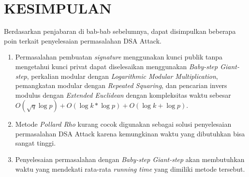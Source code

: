 \chapter{KESIMPULAN}

Berdasarkan penjabaran di bab-bab sebelumnya, dapat disimpulkan beberapa poin terkait penyelesaian permasalahan DSA Attack.
\begin{enumerate}
\item Permasalahan pembuatan \textit{signature} menggunakan kunci publik tanpa mengetahui kunci privat dapat diselesaikan menggunakan \textit{Baby-step Giant-step}, perkalian modular dengan \textit{Logarithmic Modular Multiplication}, pemangkatan modular dengan \textit{Repeated Squaring}, dan pencarian invers modulus dengan \textit{Extended Euclidean} dengan kompleksitas waktu sebesar $ O(\sqrt{q} \log p) + O (\log k * \log p) + O(\log k + \log p) $.
\item Metode \textit{Pollard Rho} kurang cocok digunakan sebagai solusi penyelesaian permasalahan DSA Attack karena kemungkinan waktu yang dibutuhkan bisa sangat tinggi.
\item Penyelesaian permasalahan dengan \textit{Baby-step Giant-step} akan membutuhkan waktu yang mendekati rata-rata \textit{running time} yang dimiliki metode tersebut.
\end{enumerate}